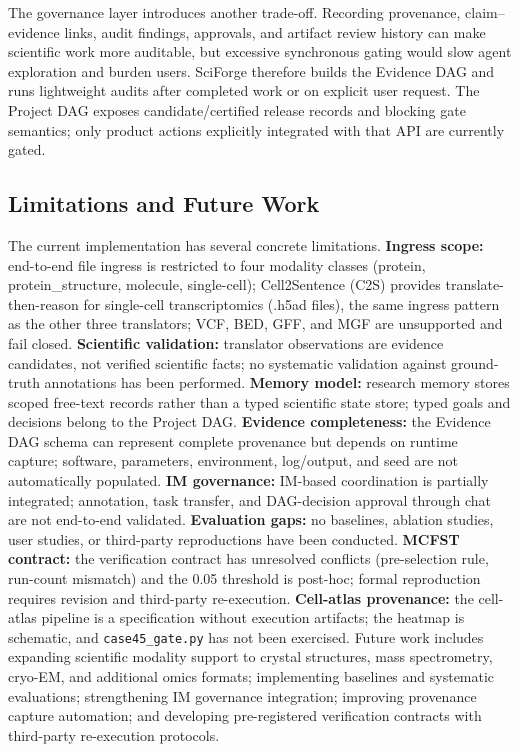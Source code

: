 \documentclass[sn-basic,Numbered,pdflatex]{sn-jnl}
\begin{document}
The governance layer introduces another trade-off. Recording provenance, claim--evidence links, audit findings, approvals, and artifact review history can make scientific work more auditable, but excessive synchronous gating would slow agent exploration and burden users. SciForge therefore builds the Evidence DAG and runs lightweight audits after completed work or on explicit user request. The Project DAG exposes candidate/certified release records and blocking gate semantics; only product actions explicitly integrated with that API are currently gated.

\subsection{Limitations and Future Work}

The current implementation has several concrete limitations. \textbf{Ingress scope:} end-to-end file ingress is restricted to four modality classes (protein, protein\_structure, molecule, single-cell); Cell2Sentence (C2S) provides translate-then-reason for single-cell transcriptomics (.h5ad files), the same ingress pattern as the other three translators; VCF, BED, GFF, and MGF are unsupported and fail closed. \textbf{Scientific validation:} translator observations are evidence candidates, not verified scientific facts; no systematic validation against ground-truth annotations has been performed. \textbf{Memory model:} research memory stores scoped free-text records rather than a typed scientific state store; typed goals and decisions belong to the Project DAG. \textbf{Evidence completeness:} the Evidence DAG schema can represent complete provenance but depends on runtime capture; software, parameters, environment, log/output, and seed are not automatically populated. \textbf{IM governance:} IM-based coordination is partially integrated; annotation, task transfer, and DAG-decision approval through chat are not end-to-end validated. \textbf{Evaluation gaps:} no baselines, ablation studies, user studies, or third-party reproductions have been conducted. \textbf{MCFST contract:} the verification contract has unresolved conflicts (pre-selection rule, run-count mismatch) and the 0.05 threshold is post-hoc; formal reproduction requires revision and third-party re-execution. \textbf{Cell-atlas provenance:} the cell-atlas pipeline is a specification without execution artifacts; the heatmap is schematic, and \texttt{case45\_gate.py} has not been exercised. Future work includes expanding scientific modality support to crystal structures, mass spectrometry, cryo-EM, and additional omics formats; implementing baselines and systematic evaluations; strengthening IM governance integration; improving provenance capture automation; and developing pre-registered verification contracts with third-party re-execution protocols.
\end{document}
